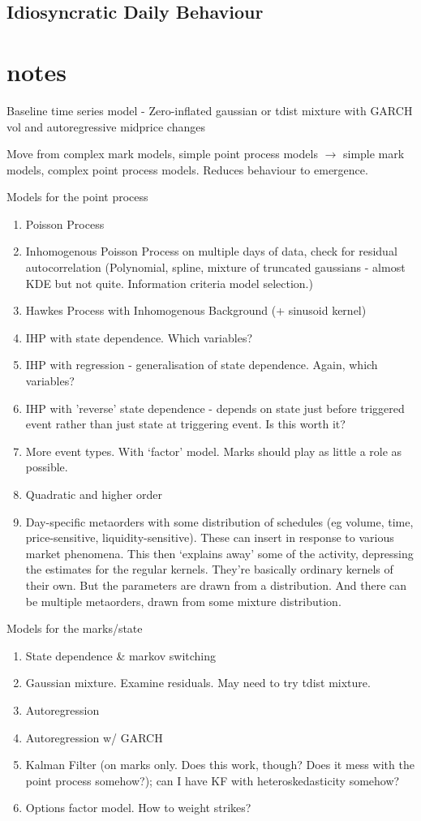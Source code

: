 \documentclass[honours,12pt]{unswthesis}
\numberwithin{equation}{section}
\begin{document}
\subsection{Idiosyncratic Daily Behaviour}


\section{notes}
Baseline time series model - Zero-inflated gaussian or tdist mixture with GARCH vol and autoregressive midprice changes

Move from complex mark models, simple point process models $\to$ simple mark models, complex point process models. Reduces behaviour to emergence.

Models for the point process
\begin{enumerate}
	\item Poisson Process
	\item Inhomogenous Poisson Process on multiple days of data, check for residual autocorrelation (Polynomial, spline, mixture of truncated gaussians - almost KDE but not quite. Information criteria model selection.)
	\item Hawkes Process with Inhomogenous Background (+ sinusoid kernel)
	\item IHP with state dependence. Which variables?
	\item IHP with regression - generalisation of state dependence. Again, which variables?
	\item IHP with 'reverse' state dependence - depends on state just before triggered event rather than just state at triggering event. Is this worth it?
	\item More event types. With `factor' model. Marks should play as little a role as possible.
	\item Quadratic and higher order
	\item Day-specific metaorders with some distribution of schedules (eg volume, time, price-sensitive, liquidity-sensitive). These can insert in response to various market phenomena. This then `explains away' some of the activity, depressing the estimates for the regular kernels. They're basically ordinary kernels of their own. But the parameters are drawn from a distribution. And there can be multiple metaorders, drawn from some mixture distribution.
\end{enumerate}

Models for the marks/state
\begin{enumerate}
	\item State dependence \& markov switching
	\item Gaussian mixture. Examine residuals. May need to try tdist mixture.
	\item Autoregression
	\item Autoregression w/ GARCH
	\item Kalman Filter (on marks only. Does this work, though? Does it mess with the point process somehow?); can I have KF with heteroskedasticity somehow?
	\item Options factor model. How to weight strikes?
\end{enumerate}
\end{document}
